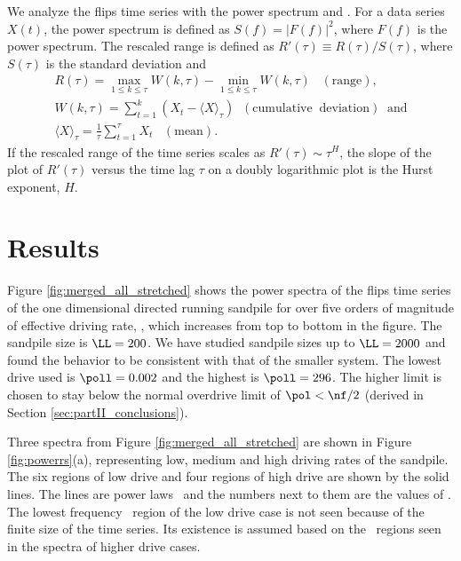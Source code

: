We analyze the flips time series with the power spectrum and \rsa.
For a data series $X(t)$, the power spectrum is defined as $S(f) =
\left|F(f)\right|^2$, where $F(f)$ is the power spectrum.  The
rescaled range \cite{hurst51a,mandel2002a} is defined as $R'(\tau)
\equiv R(\tau)/S(\tau)$, where $S(\tau)$ is the standard deviation and
\begin{gather*}
  R(\tau) = \underset{1 \leq k \leq \tau}{\max}W(k,\tau) - \underset{1 \leq k
    \leq \tau}{\min}W(k,\tau) \; \; \; \mathrm{(range),} \\
  W(k,\tau) = \sum_{t=1}^{k} (X_t - \langle X \rangle_\tau) \; \;
  \mathrm{(cumulative \; \; deviation) \; \; and} \\
  \langle X \rangle_\tau = \frac{1}{\tau} \sum_{t=1}^{\tau} X_t \; \; \;
  \mathrm{(mean).}
\end{gather*}
If the rescaled range of the time series scales as $R'(\tau) \sim
\tau^H$, the slope of the plot of $R'(\tau)$ versus the time lag
$\tau$ on a doubly logarithmic plot is the Hurst exponent, $H$.  

\section{Results}
\label{sec:partII_results}

Figure \ref{fig:merged_all_stretched} shows the power spectra of the
flips time series of the one dimensional directed running sandpile for
over five orders of magnitude of effective driving rate, \poll, which
increases from top to bottom in the figure.  The sandpile size is $\LL
= 200$. We have studied sandpile sizes up to $\LL = 2000$ and found
the behavior to be consistent with that of the smaller system.  The
lowest drive used is $\poll = 0.002$ and the highest is $\poll = 296$.
The higher limit is chosen to stay below the normal overdrive limit of
$\pol < \nf / 2$ (derived in Section \ref{sec:partII_conclusions}).

Three spectra from Figure \ref{fig:merged_all_stretched} are shown in
Figure \ref{fig:powerrs}(a), representing low, medium and high driving
rates of the sandpile.  The six regions of low drive and four regions
of high drive are shown by the solid lines.  The lines are power laws
\fb\ and the numbers next to them are the values of \bb.  The lowest
frequency \fo\ region of the low drive case is not seen because of the
finite size of the time series.  Its existence is assumed based on the
\fo\ regions seen in the spectra of higher drive cases.


